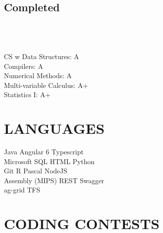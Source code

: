 \documentclass[]{deedy-resume-openfont}
\begin{document}
\begin{minipage}[t]{0.3\textwidth}
\subsection{Completed}
\\
\\
\\
\textbullet{} CS w Data Structures: A \\
\textbullet{} Compilers: A \\
\textbullet{} Numerical Methods: A \\
\textbullet{} Multi-variable Calculus: A+ \\
\textbullet{} Statistics I: A+ \\
\sectionsep

\vspace{1.5cm}

\section{LANGUAGES}
Java \textbullet{}Angular 6 \textbullet{} Typescript \\
Microsoft SQL \textbullet{} HTML \textbullet{}Python \\
Git \textbullet{} R \textbullet{} Pascal \textbullet{} NodeJS \\  Assembly (MIPS) \textbullet{} REST \textbullet{} Swagger \\ ag-grid \textbullet{} TFS

\vspace{1.5cm}
\section{CODING CONTESTS}

\sectionsep

\sectionsep



%
%

\end{minipage} 
\end{document}
